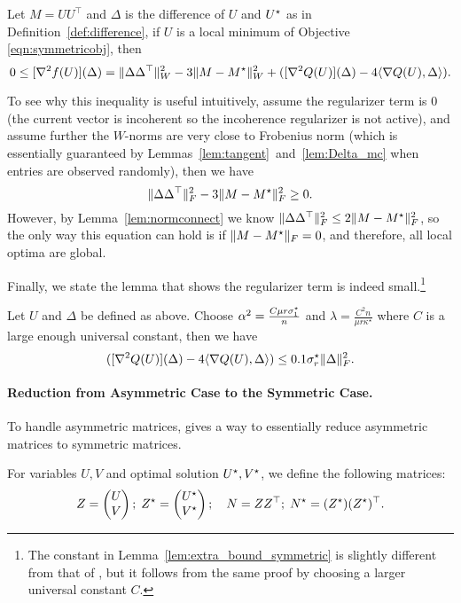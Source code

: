 \begin{lemma}
\label{lem:gjzmain_sym}
Let $M = UU^\top$ and $\Delta$ is the difference of $U$ and $U^\star$ as in Definition~\ref{def:difference}, if $U$ is a local minimum of Objective \eqref{eqn:symmetricobj}, then
\[
0 \le [\nabla^2 f(U)](\Delta) = \|\Delta\Delta^\top\|_W^2 - 3\|M-M^\star\|_W^2 + ([\nabla^2 Q(U)](\Delta) -4\langle \nabla Q(U),\Delta\rangle).
\]
\end{lemma}

To see why this inequality is useful intuitively, assume the regularizer term is 0 (the current vector is incoherent so the incoherence regularizer is not active), and assume further the $W$-norms are very close to Frobenius norm (which is essentially guaranteed by Lemmas~\ref{lem:tangent}~and~\ref{lem:Delta_mc} when entries are observed randomly), then we have
\[
\|\Delta\Delta^\top\|_F^2 - 3\|M-M^\star\|_F^2 \ge 0.
\]
However, by Lemma~\ref{lem:normconnect} we know $\|\Delta\Delta^\top\|_F^2 \le 2\|M-M^\star\|_F^2$, so the only way this equation can hold is if $\|M-M^\star\|_F = 0$, and therefore, all local optima are global.

Finally, we state the lemma that shows the regularizer term is indeed small.\footnote{
The constant in Lemma~\ref{lem:extra_bound_symmetric} is slightly different from that of \citep{GeJZ17}, but it follows from the same proof by choosing a larger universal constant $C$.}

\begin{lemma}
\label{lem:extra_bound_symmetric}
Let $U$ and $\Delta$ be defined as above.
Choose $\alpha^2 = \frac{C\mu r\sigma^\star_1}{n}$ and $\lambda = \frac{C^2 n}{\mu r\kappa^\star}$ where $C$ is a large enough universal constant, then we have
\[
([\nabla^2 Q(U)](\Delta) -4\langle \nabla Q(U),\Delta\rangle) \le 0.1\sigma^\star_r \|\Delta\|_F^2.
\]
\end{lemma}

\paragraph{Reduction from Asymmetric Case to the Symmetric Case.}

To handle asymmetric matrices, \citep{GeJZ17} gives a way to essentially reduce asymmetric matrices to symmetric matrices. 

For variables $U,V$ and optimal solution $U^\star,V^\star$, we define the following matrices:
\[
Z = 
\begin{pmatrix}
 U\\
 V
\end{pmatrix}; \;
Z^\star = 
\begin{pmatrix}
 U^\star\\
 V^\star
\end{pmatrix}; \quad
N = ZZ^\top; \; N^\star = (Z^\star)(Z^\star)^\top.
\]

